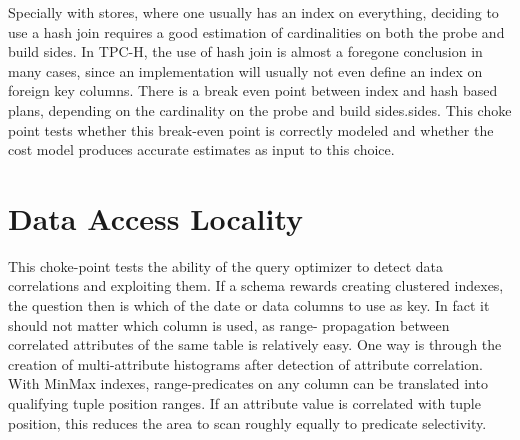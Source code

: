 %


Specially with stores, where one usually has an index on everything, deciding to use a hash join requires a good estimation of cardinalities on both the probe and build sides. In TPC-H, the use of hash join is almost a foregone conclusion in many cases, since an implementation will usually not even define an index on foreign key columns. There is a break even point between index and hash based plans, depending on the cardinality on the probe and build sides.sides. This choke point tests whether this break-even point is correctly modeled and whether the cost model produces accurate estimates as input to this choice.

%



\section{Data Access Locality}


This choke-point tests the ability of the query optimizer to detect data correlations and exploiting them. If a schema rewards creating clustered indexes, the question then is which of the date or data columns to use as key.
In fact it should not matter which column is used, as range- propagation between correlated attributes of the same table is relatively easy. One way is through the creation of multi-attribute histograms after detection of attribute correlation.
With MinMax indexes, range-predicates on any column can be translated into qualifying tuple position ranges. If an attribute value is correlated with tuple position, this reduces the area to scan roughly equally to predicate selectivity.




